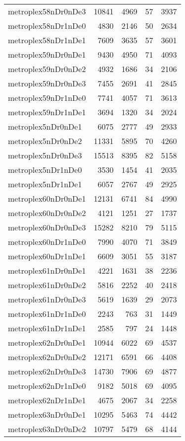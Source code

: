 \documentclass[../../../thesis.tex]{subfiles}
\begin{document}
\begin{longtable}{lrrrr}
metroplex58nDr0nDe3 & 10841 & 4969 & 57 & 3937 \\
metroplex58nDr1nDe0 & 4830 & 2146 & 50 & 2634 \\
metroplex58nDr1nDe1 & 7609 & 3635 & 57 & 3601 \\
metroplex59nDr0nDe1 & 9430 & 4950 & 71 & 4093 \\
metroplex59nDr0nDe2 & 4932 & 1686 & 34 & 2106 \\
metroplex59nDr0nDe3 & 7455 & 2691 & 41 & 2845 \\
metroplex59nDr1nDe0 & 7741 & 4057 & 71 & 3613 \\
metroplex59nDr1nDe1 & 3694 & 1320 & 34 & 2024 \\
metroplex5nDr0nDe1 & 6075 & 2777 & 49 & 2933 \\
metroplex5nDr0nDe2 & 11331 & 5895 & 70 & 4260 \\
metroplex5nDr0nDe3 & 15513 & 8395 & 82 & 5158 \\
metroplex5nDr1nDe0 & 3530 & 1454 & 41 & 2035 \\
metroplex5nDr1nDe1 & 6057 & 2767 & 49 & 2925 \\
metroplex60nDr0nDe1 & 12131 & 6741 & 84 & 4990 \\
metroplex60nDr0nDe2 & 4121 & 1251 & 27 & 1737 \\
metroplex60nDr0nDe3 & 15282 & 8210 & 79 & 5115 \\
metroplex60nDr1nDe0 & 7990 & 4070 & 71 & 3849 \\
metroplex60nDr1nDe1 & 6609 & 3051 & 55 & 3187 \\
metroplex61nDr0nDe1 & 4221 & 1631 & 38 & 2236 \\
metroplex61nDr0nDe2 & 5816 & 2252 & 40 & 2418 \\
metroplex61nDr0nDe3 & 5619 & 1639 & 29 & 2073 \\
metroplex61nDr1nDe0 & 2243 & 763 & 31 & 1449 \\
metroplex61nDr1nDe1 & 2585 & 797 & 24 & 1448 \\
metroplex62nDr0nDe1 & 10944 & 6022 & 69 & 4537 \\
metroplex62nDr0nDe2 & 12171 & 6591 & 66 & 4408 \\
metroplex62nDr0nDe3 & 14730 & 7906 & 69 & 4877 \\
metroplex62nDr1nDe0 & 9182 & 5018 & 69 & 4095 \\
metroplex62nDr1nDe1 & 4675 & 2067 & 34 & 2258 \\
metroplex63nDr0nDe1 & 10295 & 5463 & 74 & 4442 \\
metroplex63nDr0nDe2 & 10797 & 5479 & 68 & 4144 \\

\end{longtable}
\end{document}

